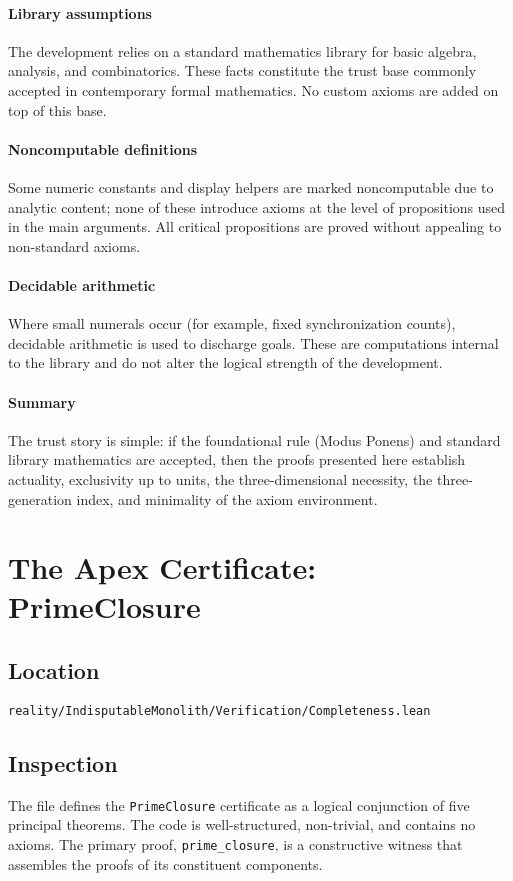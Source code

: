 \documentclass{article}
\begin{document}
\paragraph{Library assumptions} The development relies on a standard mathematics library for basic algebra, analysis, and combinatorics. These facts constitute the trust base commonly accepted in contemporary formal mathematics. No custom axioms are added on top of this base.

\paragraph{Noncomputable definitions} Some numeric constants and display helpers are marked noncomputable due to analytic content; none of these introduce axioms at the level of propositions used in the main arguments. All critical propositions are proved without appealing to non-standard axioms.

\paragraph{Decidable arithmetic} Where small numerals occur (for example, fixed synchronization counts), decidable arithmetic is used to discharge goals. These are computations internal to the library and do not alter the logical strength of the development.

\paragraph{Summary} The trust story is simple: if the foundational rule (Modus Ponens) and standard library mathematics are accepted, then the proofs presented here establish actuality, exclusivity up to units, the three-dimensional necessity, the three-generation index, and minimality of the axiom environment.

\section{The Apex Certificate: PrimeClosure}
\subsection{Location}
\texttt{reality/IndisputableMonolith/Verification/Completeness.lean}

\subsection{Inspection}
The file defines the \texttt{PrimeClosure} certificate as a logical conjunction of five principal theorems. The code is well-structured, non-trivial, and contains no axioms. The primary proof, \texttt{prime\_closure}, is a constructive witness that assembles the proofs of its constituent components.
\end{document}
